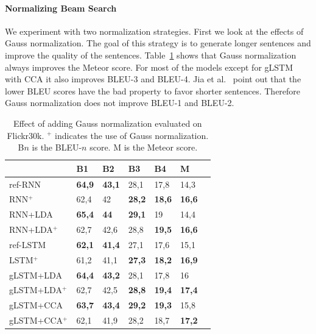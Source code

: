 \documentclass[twoside,twocolumn]{article}
\begin{document}
\paragraph{Normalizing Beam Search}
We experiment with two normalization strategies. First we look at the effects of Gauss normalization. The goal of this strategy is to generate longer sentences and improve the quality of the sentences. Table~\ref{table:results_gauss} shows that Gauss normalization always improves the Meteor score. For most of the models except for gLSTM with CCA it also improves BLEU-3 and BLEU-4. Jia et al.~\cite{Jia2014} point out that the lower BLEU scores have the bad property to favor shorter sentences. Therefore Gauss normalization does not improve BLEU-1 and BLEU-2.

\begin{table}
    \centering
    \begin{tabular}{lllllll}
        & B1 & B2 & B3 & B4 & M \\ \hline
            ref-RNN          & \textbf{64,9}  & \textbf{43,1}     & 28,1   & 17,8   & 14,3          \\
            RNN$^+$       & 62,4   & 42     & \textbf{28,2}   & \textbf{18,6}   & \textbf{16,6}          \\ \hline
            RNN+LDA         & \textbf{65,4}   & \textbf{44}     & \textbf{29,1}   &19     & 14,4 \\
            RNN+LDA$^+$ & 62,7   & 42,6   & 28,8   & \textbf{19,5}   & \textbf{16,6}           \\ \hline 
            ref-LSTM         & \textbf{62,1}   & \textbf{41,4}   & 27,1   & 17,6   & 15,1  \\
            LSTM$^+$        & 61,2   & 41,1   & \textbf{27,3}   & \textbf{18,2}   & \textbf{16,9}  \\ \hline
            gLSTM+LDA         & \textbf{64,4}   & \textbf{43,2}   & 28,1   & 17,8   & 16  \\
            gLSTM+LDA$^+$ & 62,7   & 42,5   & \textbf{28,8}   & \textbf{19,4}   & \textbf{17,4}  \\\hline
            gLSTM+CCA         & \textbf{63,7}   & \textbf{43,4}   & \textbf{29,2}   &\textbf{19,3}   & 15,8  \\
            gLSTM+CCA$^+$ & 62,1   & 41,9   & 28,2   & 18,7   & \textbf{17,2}  \\\hline
    \end{tabular}
    \caption{Effect of adding Gauss normalization evaluated on Flickr30k. $^+$ indicates the use of Gauss normalization. B$n$ is the BLEU-$n$ score. M is the Meteor score.}
    \label{table:results_gauss}
\end{table}
\end{document}
